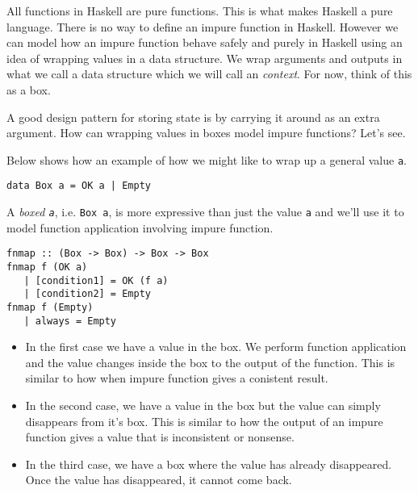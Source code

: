 
All functions in Haskell are pure functions. This is what makes Haskell a pure language.
There is no way to define an impure function in Haskell.
However we can model how an impure function behave safely and purely in Haskell
using an idea of {wrapping values} in a data structure. 
We wrap arguments and outputs in what we call a data structure which we will call an
 \textit{context}. For now, think of this as a box.

A good design pattern for storing state is by carrying it around as an extra 
argument.
How can wrapping values in boxes model impure functions? Let's see.



Below shows how an example of how we might like to wrap up a general value \lstinline{a}.
\begin{lstlisting}
data Box a = OK a | Empty
\end{lstlisting}

A \textit{boxed \lstinline{a}}, i.e. \lstinline{Box a}, is more 
expressive than just the value \lstinline{a} and we'll use it to model 
function application involving impure function.

\begin{lstlisting}
fnmap :: (Box -> Box) -> Box -> Box 
fnmap f (OK a) 
   | [condition1] = OK (f a)
   | [condition2] = Empty
fnmap f (Empty)
   | always = Empty
\end{lstlisting}


\begin{itemize}   
\renewcommand{\labelitemi}{$\Box$}
\item In the first case we have a value in the box.
We perform function application and the value changes inside the box to the output 
of the function. This is similar to how when impure function gives a conistent result.
\item In the second case,  we have a value in the box but
 the value can simply disappears from it's box. This is similar 
to how the output of an impure function gives a value that is inconsistent or nonsense. 
\item In the third case, we have a box where the value has 
already disappeared. Once the value has disappeared, it cannot come back. 
\end{itemize}



